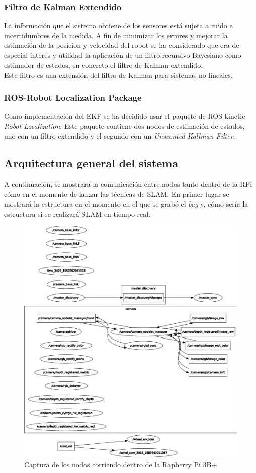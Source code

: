 \subsubsection{Filtro de Kalman Extendido}
La información que el sistema obtiene de los sensores está sujeta a ruido e incertidumbres de la medida. A fin de minimizar los errores y mejorar la estimación de la posicion y velocidad del robot se ha 
considerado que era de especial interes y utilidad la aplicación de un filtro recursivo Bayesiano como estimador de estados, en concreto el filtro de Kalman extendido. \\
Este filtro es una extensión del filtro de Kalman para sistemas no lineales.

\subsubsection{ROS-Robot Localization Package}
Como implementación del EKF se ha decidido usar el paquete de ROS kinetic \textit{Robot Localization}\cite{MooreStouchKeneralizedEkf2014}. Este paquete contiene dos nodos de estimación de estados, uno con un filtro extendido y el segundo con un \textit{Unscented Kallman Filter}.

\newpage

\subsection{Arquitectura general del sistema}
A continuación, se mostrará la comunicación entre nodos tanto dentro de la RPi cómo en el momento de lanzar las técnicas de SLAM. En primer lugar se mostrará la estructura en el momento en el que se grabó
el \textit{bag} y, cómo sería la estructura si se realizará SLAM en tiempo real:
\begin{figure}[!ht]
    \centering
    \includegraphics[width=.8\textwidth]{images/rqt_graphs/rpi_onboardBAG.pdf}
    \caption{Captura de los nodos corriendo dentro de la Rapberry Pi 3B+}
    \label{rqt01}
\end{figure}

